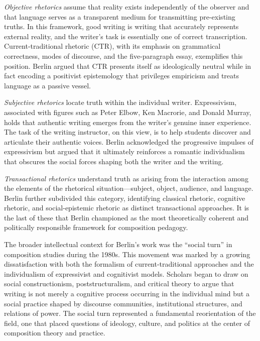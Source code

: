 \documentclass[12pt]{article}
\begin{document}
\textit{Objective rhetorics} assume that reality exists independently of the observer and that language serves as a transparent medium for transmitting pre-existing truths. In this framework, good writing is writing that accurately represents external reality, and the writer's task is essentially one of correct transcription. Current-traditional rhetoric (CTR), with its emphasis on grammatical correctness, modes of discourse, and the five-paragraph essay, exemplifies this position. Berlin argued that CTR presents itself as ideologically neutral while in fact encoding a positivist epistemology that privileges empiricism and treats language as a passive vessel.

\textit{Subjective rhetorics} locate truth within the individual writer. Expressivism, associated with figures such as Peter Elbow, Ken Macrorie, and Donald Murray, holds that authentic writing emerges from the writer's genuine inner experience. The task of the writing instructor, on this view, is to help students discover and articulate their authentic voices. Berlin acknowledged the progressive impulses of expressivism but argued that it ultimately reinforces a romantic individualism that obscures the social forces shaping both the writer and the writing.

\textit{Transactional rhetorics} understand truth as arising from the interaction among the elements of the rhetorical situation---subject, object, audience, and language. Berlin further subdivided this category, identifying classical rhetoric, cognitive rhetoric, and social-epistemic rhetoric as distinct transactional approaches. It is the last of these that Berlin championed as the most theoretically coherent and politically responsible framework for composition pedagogy.

The broader intellectual context for Berlin's work was the ``social turn'' in composition studies during the 1980s. This movement was marked by a growing dissatisfaction with both the formalism of current-traditional approaches and the individualism of expressivist and cognitivist models. Scholars began to draw on social constructionism, poststructuralism, and critical theory to argue that writing is not merely a cognitive process occurring in the individual mind but a social practice shaped by discourse communities, institutional structures, and relations of power. The social turn represented a fundamental reorientation of the field, one that placed questions of ideology, culture, and politics at the center of composition theory and practice.
\end{document}
